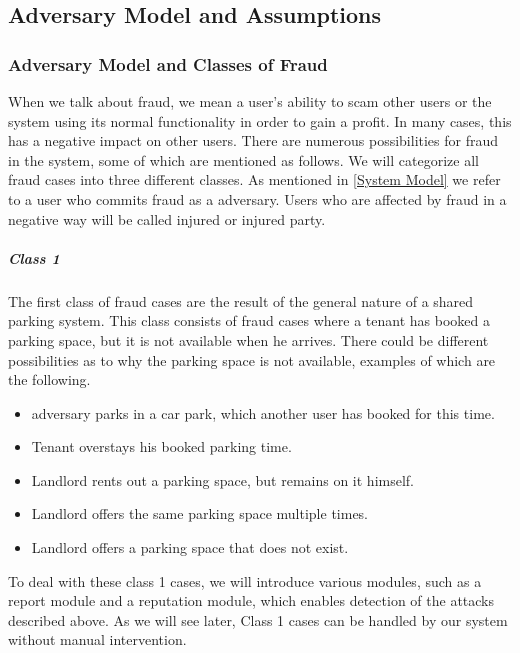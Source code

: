 \documentclass[
a4paper,     %
titlepage,   %
14pt         %
]{scrartcl}  %
\theoremstyle{mystyle}
\begin{document}
\subsection{Adversary Model and Assumptions}

\subsubsection{Adversary Model and Classes of Fraud}
When we talk about fraud, we mean a user's ability to scam other users or the system using its normal functionality in order to gain a profit. In many cases, this has a negative impact on other users. There are numerous possibilities for fraud in the system, some of which are mentioned as follows. We will categorize all fraud cases into three different classes. As mentioned in \ref{System Model} we refer to a user who commits fraud as a adversary. Users who are affected by fraud in a negative way will be called injured or injured party. \\

\subparagraph{Class 1} The first class of fraud cases are the result of the general nature of a shared parking system. This class consists of fraud cases where a tenant has booked a parking space, but it is not available when he arrives. There could be different possibilities as to why the parking space is not available, examples of which are the following.
\begin{itemize}
\item adversary parks in a car park, which another user has booked for this time.
\item Tenant overstays his booked parking time.
\item Landlord rents out a parking space, but remains on it himself.
\item Landlord offers the same parking space multiple times.
\item Landlord offers a parking space that does not exist.
\end{itemize}
To deal with these class 1 cases, we will introduce various modules, such as a report module and a reputation module, which enables detection of the attacks described above. As we will see later, Class 1 cases can be handled by our system without manual intervention. 
\end{document}
